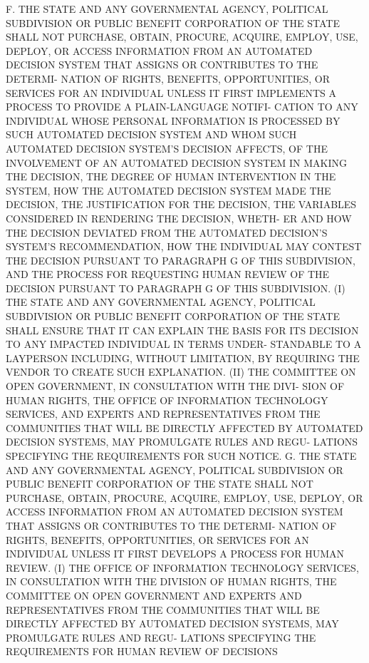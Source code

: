    F.  THE  STATE  AND  ANY GOVERNMENTAL AGENCY, POLITICAL SUBDIVISION OR
 PUBLIC BENEFIT CORPORATION OF THE  STATE  SHALL  NOT  PURCHASE,  OBTAIN,
 PROCURE,  ACQUIRE,  EMPLOY,  USE,  DEPLOY, OR ACCESS INFORMATION FROM AN
 AUTOMATED DECISION SYSTEM THAT ASSIGNS OR CONTRIBUTES  TO  THE  DETERMI-
 NATION OF RIGHTS, BENEFITS, OPPORTUNITIES, OR SERVICES FOR AN INDIVIDUAL
 UNLESS IT FIRST IMPLEMENTS A PROCESS TO PROVIDE A PLAIN-LANGUAGE NOTIFI-
 CATION TO ANY INDIVIDUAL WHOSE PERSONAL INFORMATION IS PROCESSED BY SUCH
 AUTOMATED  DECISION  SYSTEM  AND  WHOM  SUCH AUTOMATED DECISION SYSTEM'S
 DECISION AFFECTS, OF THE INVOLVEMENT OF AN AUTOMATED DECISION SYSTEM  IN
 MAKING THE DECISION, THE DEGREE OF HUMAN INTERVENTION IN THE SYSTEM, HOW
 THE  AUTOMATED  DECISION SYSTEM MADE THE DECISION, THE JUSTIFICATION FOR
 THE DECISION, THE VARIABLES CONSIDERED IN RENDERING THE DECISION, WHETH-
 ER AND HOW THE DECISION DEVIATED FROM THE AUTOMATED DECISION'S  SYSTEM'S
 RECOMMENDATION,  HOW THE INDIVIDUAL MAY CONTEST THE DECISION PURSUANT TO
 PARAGRAPH G OF THIS SUBDIVISION, AND THE PROCESS  FOR  REQUESTING  HUMAN
 REVIEW OF THE DECISION PURSUANT TO PARAGRAPH G OF THIS SUBDIVISION.
   (I)  THE  STATE  AND ANY GOVERNMENTAL AGENCY, POLITICAL SUBDIVISION OR
 PUBLIC BENEFIT CORPORATION OF THE STATE SHALL ENSURE THAT IT CAN EXPLAIN
 THE BASIS FOR ITS DECISION TO ANY IMPACTED INDIVIDUAL  IN  TERMS  UNDER-
 STANDABLE TO A LAYPERSON INCLUDING, WITHOUT LIMITATION, BY REQUIRING THE
 VENDOR TO CREATE SUCH EXPLANATION.
   (II)  THE COMMITTEE ON OPEN GOVERNMENT, IN CONSULTATION WITH THE DIVI-
 SION OF HUMAN RIGHTS, THE OFFICE OF INFORMATION TECHNOLOGY SERVICES, AND
 EXPERTS AND REPRESENTATIVES FROM THE COMMUNITIES THAT WILL  BE  DIRECTLY
 AFFECTED  BY  AUTOMATED DECISION SYSTEMS, MAY PROMULGATE RULES AND REGU-
 LATIONS SPECIFYING THE REQUIREMENTS FOR SUCH NOTICE.
   G. THE STATE AND ANY GOVERNMENTAL  AGENCY,  POLITICAL  SUBDIVISION  OR
 PUBLIC  BENEFIT  CORPORATION  OF  THE  STATE SHALL NOT PURCHASE, OBTAIN,
 PROCURE, ACQUIRE, EMPLOY, USE, DEPLOY, OR  ACCESS  INFORMATION  FROM  AN
 AUTOMATED  DECISION  SYSTEM  THAT ASSIGNS OR CONTRIBUTES TO THE DETERMI-
 NATION OF RIGHTS, BENEFITS, OPPORTUNITIES, OR SERVICES FOR AN INDIVIDUAL
 UNLESS IT FIRST DEVELOPS A PROCESS FOR HUMAN REVIEW.
   (I) THE OFFICE OF INFORMATION  TECHNOLOGY  SERVICES,  IN  CONSULTATION
 WITH  THE DIVISION OF HUMAN RIGHTS, THE COMMITTEE ON OPEN GOVERNMENT AND
 EXPERTS AND REPRESENTATIVES FROM THE COMMUNITIES THAT WILL  BE  DIRECTLY
 AFFECTED  BY  AUTOMATED DECISION SYSTEMS, MAY PROMULGATE RULES AND REGU-
 LATIONS SPECIFYING  THE  REQUIREMENTS  FOR  HUMAN  REVIEW  OF  DECISIONS

